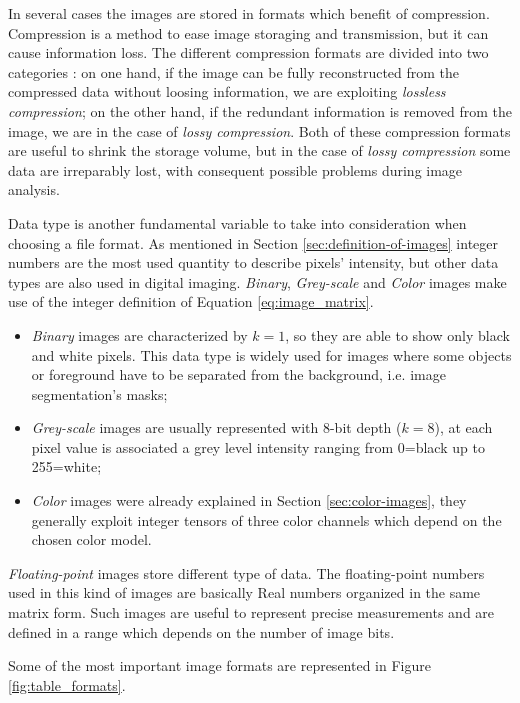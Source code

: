 \documentclass[../main.tex]{subfiles}
\begin{document}
In several cases the images are stored in formats which benefit of compression. Compression is a method to ease image storaging and transmission, but it can cause information loss. The different compression formats are divided into two categories \cite{digital_processing_matlab}:
on one hand, if the image can be fully reconstructed from the compressed data without loosing information, we are exploiting \textit{lossless compression}; on the other hand, if the redundant information is removed from the image, we are in the case of \textit{lossy compression}.
Both of these compression formats are useful to shrink the storage volume, but in the case of \textit{lossy compression} some data are irreparably lost, with consequent possible problems during image analysis.

Data type is another fundamental variable to take into consideration when choosing a file format. 
As mentioned in Section \ref{sec:definition-of-images} integer numbers are the most used quantity to describe pixels' intensity, but other data types are also used in digital imaging.
\textit{Binary}, \textit{Grey-scale} and \textit{Color} images make use of the integer definition of Equation \ref{eq:image_matrix}.
\begin{itemize}
    \item \textit{Binary} images are  characterized by $k=1$, so they are able to show only black and white pixels.
    This data type is widely used for images where some objects or foreground have to be separated from the background, i.e. image segmentation's masks;
    \item \textit{Grey-scale} images are usually represented with 8-bit depth ($k=8$), at each pixel value is associated a grey level intensity ranging from 0=black up to 255=white;
    \item \textit{Color} images were already explained in Section \ref{sec:color-images}, they generally exploit integer tensors of three color channels which depend on the chosen color model.
\end{itemize}
\textit{Floating-point} images store different type of data. 
The floating-point numbers used in this kind of images are basically Real numbers organized in the same matrix form. 
Such images are useful to represent precise measurements and are defined in a range which depends on the number of image bits.

Some of the most important image formats are represented in Figure \ref{fig:table_formats}.
\end{document}

